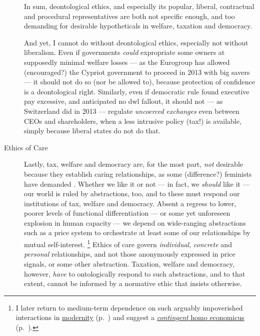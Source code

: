\begin{description}
	In sum, deontological ethics, and especially its popular, liberal, contractual and procedural representatives are both not specific enough, and too demanding for desirable hypotheticals in welfare, taxation and democracy.

	And yet, I cannot do without deontological ethics, especially not without liberalism.
	Even if governments \emph{could} expropriate some owners at supposedly minimal welfare losses --- as the Eurogroup has allowed (encouraged?) the Cypriot government to proceed in 2013 with big savers --- it should not do so (nor be allowed to), because protection of confidence is a deontological right.
	Similarly, even if democratic rule found executive pay excessive, and anticipated no \gls{dwl} fallout, it should not --- as Switzerland did in 2013 --- regulate \emph{uncoerced exchanges} \citep{Nozick1974} even between CEOs and shareholders, when a less intrusive policy (tax!) is available, simply because liberal states do not do that.

	\item[Ethics of Care]
		\label{itm:ethics-of-care}
	Lastly, tax, welfare and democracy are, for the most part, \emph{not} desirable because they establish caring relationships, as some (difference?) feminists have demanded \citep{Noddings1984,Gilligan1982}.
	Whether we like it or not --- in fact, we \emph{should} like it --- our world is ruled by abstractions, too, and to these must respond our institutions of tax, welfare and democracy.
	Absent a regress to lower, poorer levels of functional differentiation --- or some yet unforeseen explosion in human capacity --- we depend on wide-ranging abstractions such as a price system to orchestrate at least some of our relationships by mutual self-interest.
	\footnote{
		I later return to medium-term dependence on such arguably impoverished interactions in \hyperref[sec:modernity]{modernity} (p.~\pageref{sec:modernity}) and suggest a \hyperref[sec:contingent-homo-economicus]{\emph{contingent} homo economicus} (p.~\pageref{sec:contingent-homo-economicus}).
	}
	Ethics of care govern \emph{individual}, \emph{concrete} and \emph{personal} relationships, and not those anonymously expressed in price signals, or some other abstraction.
	Taxation, welfare and democracy, however, \emph{have} to ontologically respond to such abstractions, and to that extent, cannot be informed by a normative ethic that insists otherwise.


\end{description}
